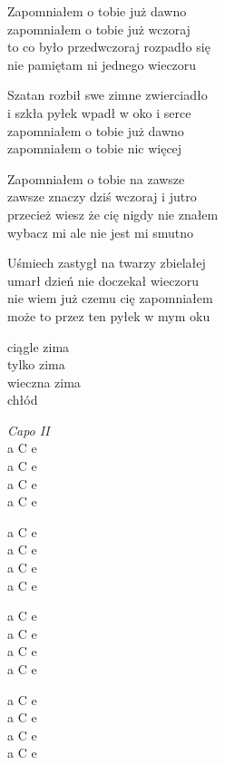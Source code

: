 \begin{text}
    \hfill\break
    Zapomniałem o tobie już dawno\\
    zapomniałem o tobie już wczoraj\\
    to co było przedwczoraj rozpadło się\\
    nie pamiętam ni jednego wieczoru

    Szatan rozbił swe zimne zwierciadło\\
    i szkła pyłek wpadł w oko i serce\\
    zapomniałem o tobie już dawno\\
    zapomniałem o tobie nic więcej

    Zapomniałem o tobie na zawsze\\
    zawsze znaczy dziś wczoraj i jutro\\
    przecież wiesz że cię nigdy nie znałem\\
    wybacz mi ale nie jest mi smutno

    Uśmiech zastygł na twarzy zbielałej\\
    umarł dzień nie doczekał wieczoru\\
    nie wiem już czemu cię zapomniałem\\
    może to przez ten pyłek w mym oku

    ciągle zima\\
    tylko zima\\
    wieczna zima\\
    chłód
\end{text}
\begin{chord}
    \textit{Capo II}\\
    a C e\\
    a C e\\
    a C e\\
    a C e

    a C e\\
    a C e\\
    a C e\\
    a C e

    a C e\\
    a C e\\
    a C e\\
    a C e

    a C e\\
    a C e\\
    a C e\\
    a C e
\end{chord}